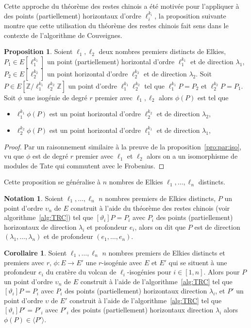 \documentclass[10pt,a4paper]{book}
\theoremstyle{plain}
\theoremstyle{definition}
\theoremstyle{definition}
\newtheorem{cor}[thm]{Corollaire}
\theoremstyle{definition}
\newtheorem{prop}[thm]{Proposition}
\theoremstyle{definition}
\theoremstyle{remark}
\theoremstyle{remark}
\theoremstyle{definition}
\newtheorem{nota}[thm]{Notation}
\begin{document}
Cette approche du théorème des restes chinois a été motivée pour l'appliquer à 
des points (partiellement) horizontaux d'ordre $\ell_i^{k_i}$, la proposition 
suivante montre que cette utilisation du théorème des restes chinois fait sens 
dans le contexte de l'algorithme de Couveignes.

\begin{prop}
\label{pro:par:TRC}
Soient $\ell_1, \ell_2$ deux nombres premiers distincts de Elkies, 
$P_1 \in E[\ell_1^{k_1}]$ un point (partiellement) horizontal d'ordre 
$\ell_1^{k_1}$ et de direction $\lambda_1$, $P_2 \in E[\ell_2^{k_2}]$ un point 
horizontal d'ordre $\ell_2^{k_2}$ et de direction $\lambda_2$. Soit $P \in 
E[\mathbb{Z}/\ell_1^{k_1}\ell_2^{k_2}\mathbb{Z}]$ un point d'ordre 
$\ell_1^{k_1}\ell_2^{k_2}$ tel que $\ell_1^{k_1}P=P_2$ et $\ell_2^{k_2}P=P_1$.
Soit $\phi$ une isogénie de degré $r$ premier avec $\ell_1, \ell_2$ alors 
$\phi(P)$ est tel que
\begin{itemize}
\item $\ell_1^{k_1}\phi(P)$ est un point horizontal d'ordre 
$\ell_2^{k_2}$ et de direction $\lambda_2$,  
\item $\ell_2^{k_2}\phi(P)$ est un point horizontal d'ordre 
$\ell_1^{k_1}$ et de direction $\lambda_1$,
\end{itemize}
\end{prop}

\begin{proof}
Par un raisonnement similaire à la preuve de la proposition~\ref{pro:par:iso}, 
vu que $\phi$ est de degré $r$ premier avec $\ell_1$ et $\ell_2$ alors on a un 
isomorphisme de modules de Tate qui commutent avec le Frobenius.
\end{proof}

Cette proposition se généralise à $n$ nombres de Elkies $\ell_1, \dots, \ell_n$
distincts.

\begin{nota}
Soient $\ell_1, \dots, \ell_n$ $n$ nombres premiers de Elkies distincts, $P$ un
 point d'ordre $\upsilon_n$ de $E$ construit à l'aide du 
 théorème des restes chinois (voir algorithme~\ref{alg:TRC}) tel que 
$[\vartheta_i]P=P_i$ avec $P_i$ des points (partiellement) horizontaux de 
direction $\lambda_i$ et profondeur $e_i$, alors 
on dit que $P$ est de direction $(\lambda_1, \dots, \lambda_n)$ et de 
profondeur $(e_1, \dots, e_n)$. 
\end{nota}

\begin{cor}
Soient $\ell_1, \dots, \ell_n$ $n$ nombres premiers de Elkies distincts et 
premiers avec $r$, $\phi: E \rightarrow E'$ une $r$-isogénie avec $E$ et $E'$ 
qui se situent à une profondeur $e_i$ du cratère du volcan de 
$\ell_i$-isogénies pour $i \in [1,n]$. Alors pour $P$ un
 point d'ordre $\upsilon_n$ de $E$ construit à l'aide de 
l'algorithme~\ref{alg:TRC} tel que $[\vartheta_i]P=P_i$ 
avec $P_i$ des points (partiellement) horizontaux direction $\lambda_i$, et 
$P'$ un point d'ordre $\upsilon$ de $E'$ construit à l'aide de 
l'algorithme~\ref{alg:TRC} tel que $[\vartheta_i]P'=P'_i$ 
avec $P'_i$ des points (partiellement) horizontaux direction $\lambda_i$
 alors $\phi(P) \in \langle P' \rangle$. 
\end{cor}
\end{document}
